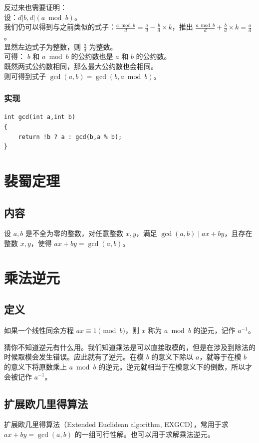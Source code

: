 \documentclass[11pt,oneside,a4paper,UTF8]{book}
\begin{document}
	\noindent
	反过来也需要证明：\\
	设：$d | b,d | (a \bmod b)$。\\
	我们仍可以得到与之前类似的式子：$\frac{a \bmod b}{d} = \frac{a}{d} - \frac{b}{d} \times k$，推出 $\frac{a \bmod b}{d} + \frac{b}{d} \times k = \frac{a}{d}$。\\
	显然左边式子为整数，则 $\frac{a}{d}$ 为整数。\\
	可得： $b$ 和 $a \bmod b$ 的公约数也是 $a$ 和 $b$ 的公约数。\\
	
	\noindent
	既然两式公约数相同，那么最大公约数也会相同。\\
	则可得到式子 $\gcd(a,b) = \gcd(b,a\bmod b)$。
	
	\subsubsection{实现}
	\begin{lstlisting}
int gcd(int a,int b)
{
	return !b ? a : gcd(b,a % b);
}
	\end{lstlisting}
	
	\section{裴蜀定理}
	\subsection{内容}
	设 $a,b$ 是不全为零的整数，对任意整数 $x,y$，满足 $\gcd(a,b)\mid ax+by$，且存在整数 $x,y$，使得 $ax+by=\gcd(a,b)$。
	\section{乘法逆元}
	\subsection{定义}
	如果一个线性同余方程 $ax \equiv 1 \pmod b$，则 $x$ 称为 $a \bmod b$ 的逆元，记作 $a^{-1}$。\par
	猜你不知道逆元有什么用。我们知道乘法是可以直接取模的，但是在涉及到除法的时候取模会发生错误。应此就有了逆元。在模 $b$ 的意义下除以 $a$，就等于在模 $b$ 的意义下将原数乘上 $a\bmod b$ 的逆元。逆元就相当于在模意义下的倒数，所以才会被记作 $a^{-1}$。
	\subsection{扩展欧几里得算法}
	扩展欧几里得算法（Extended Euclidean algorithm, EXGCD），常用于求 $ax+by=\gcd(a,b)$ 的一组可行性解。也可以用于求解乘法逆元。
\end{document}
